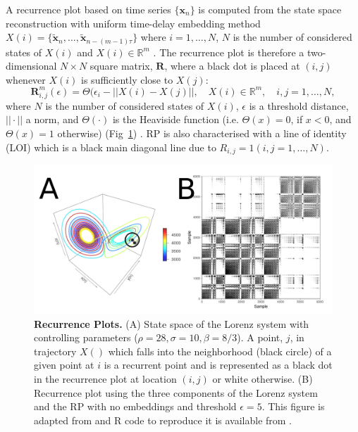 A recurrence plot based on time series $\{ \boldsymbol{x}_n \}$ is computed 
from the state space reconstruction with uniform time-delay embedding method 
$X(i)=\{ \boldsymbol{ \tilde{x} }_n, \dots,  
\boldsymbol{ \tilde{x} }_{n -(m-1)\tau} \}$
where $i=1,\dots,N$, $N$ is the number of considered states of $X(i)$ 
and $X(i) \in \mathbb{R}^m$ \citep{eckmann1987}.
The recurrence plot is therefore a two-dimensional $N \times N$ square matrix, 
$\mathbf{R}$, where a black dot is placed at $(i,j)$ whenever $X(i)$ is 
sufficiently close to $X(j)$: 
\begin{equation}
\mathbf{R}^{m}_{i,j} (\epsilon) = 
	\Theta ( \epsilon_i - || X(i) - X(j) ||, \quad 
	X(i) \in \mathbb{R}^m, \quad i,j=1,\dots,N,
\end{equation}
where $N$ is the number of considered states of $X(i)$, $\epsilon$ is a 
threshold distance, $|| \cdotp ||$ a norm, and $\Theta(\cdotp)$ is the 
Heaviside function (i.e. $\Theta(x)=0$, if $x<0$, and $\Theta(x)=1$ otherwise) 
(Fig~\ref{fig:mrp}) \citep{eckmann1987, marwan2007,marwan2015}.
RP is also characterised with a line of identity (LOI) which is a black main 
diagonal line due to $ R_{i,j}=1 (i,j=1,\dots,N)$. 
\begin{figure}[!h]
  \centering
    \includegraphics[width=1.0\textwidth]{rp}
    \caption{
	{\bf Recurrence Plots.} 
	(A) State space of the Lorenz system with controlling parameters 
	($\rho=28, \sigma=10, \beta=8/3$). A point, $j$, in trajectory $X()$ 
	which falls into the neighborhood (black circle) of a given point 
	at $i$ is a recurrent point and is represented as a black dot in 
	the recurrence plot at location $(i, j)$ or white otherwise.
	(B) Recurrence plot using the three components of the Lorenz 
	system and the RP with no embeddings and threshold $\epsilon=5$.
	This figure is adapted from \cite{marwan2015} and R code to 
	reproduce it is available from \cite{hwum2018}.
	}
    \label{fig:mrp}
\end{figure}




